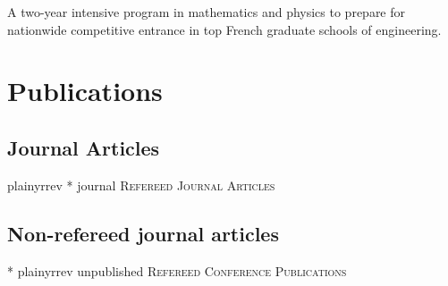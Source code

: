 \documentclass[11pt,a4paper,sans]{moderncv} %
\begin{document}
{A two-year intensive program in mathematics and physics to prepare for nationwide competitive entrance in top French graduate schools of engineering.}







\newpage


\section{Publications}

\subsection{Journal Articles}
{plainyrrev}
\nocite{journal}{*}
{journal}
{\large \textsc{Refereed Journal Articles}}

\subsection{Non-refereed journal articles}
\nocite{unpublished}{*}
{plainyrrev}
{unpublished}
{\large \textsc{Refereed Conference Publications}}
\end{document}
